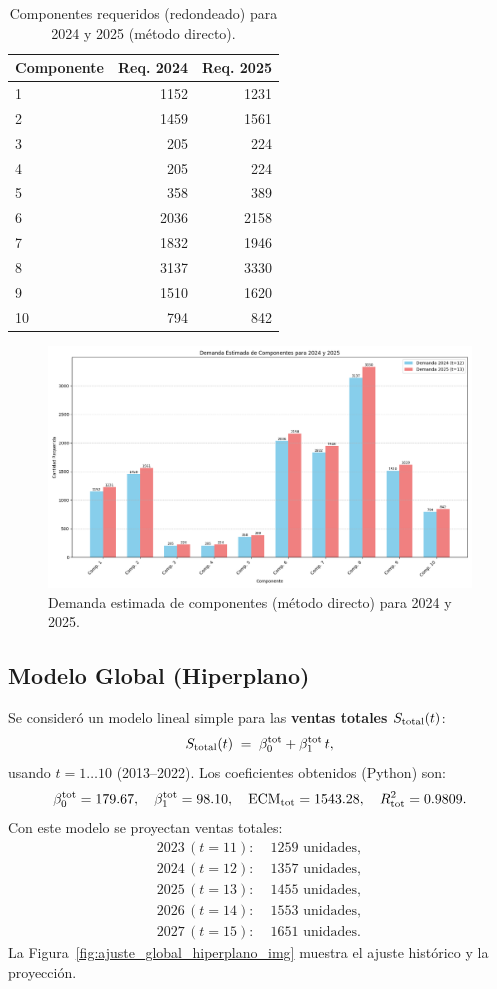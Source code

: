 \documentclass[12pt,a4paper]{article}
\newcommand{\tablesmall}{\scriptsize}
\begin{document}
\begin{table}[H]
\tablesmall
\centering
\caption{Componentes requeridos (redondeado) para 2024 y 2025 (método directo).}
\label{tab:componentes_directos}
\begin{tabular}{@{}lrr@{}}
\toprule
Componente & Req. 2024 & Req. 2025 \\ \midrule
1  & 1152 & 1231 \\
2  & 1459 & 1561 \\
3  & 205  & 224  \\
4  & 205  & 224  \\
5  & 358  & 389  \\
6  & 2036 & 2158 \\
7  & 1832 & 1946 \\
8  & 3137 & 3330 \\
9  & 1510 & 1620 \\
10 & 794  & 842  \\ \bottomrule
\end{tabular}
\end{table}

\begin{figure}[H]
\centering
\includegraphics[width=0.7\linewidth]{Demanda estimada de componentes para 2024 y 2025.png}
\caption{Demanda estimada de componentes (método directo) para 2024 y 2025.}
\label{fig:demanda_componentes_2024_2025_img}
\end{figure}

\subsection{Modelo Global (Hiperplano)}
Se consideró un modelo lineal simple para las \textbf{ventas totales} $S_{\rm total}(t)$:
\[
S_{\rm total}(t) \;=\; \beta_0^{\rm tot} + \beta_1^{\rm tot}\,t,
\]
usando $t=1\dots10$ (2013–2022). Los coeficientes obtenidos (Python) son:
\[
\beta_0^{\rm tot} = 179.67,\quad \beta_1^{\rm tot} = 98.10,\quad
\text{ECM}_{\rm tot} = 1543.28,\quad R^2_{\rm tot} = 0.9809.
\]
Con este modelo se proyectan ventas totales:
\[
\begin{aligned}
2023\,(t=11):\;&1259\text{ unidades},\\
2024\,(t=12):\;&1357\text{ unidades},\\
2025\,(t=13):\;&1455\text{ unidades},\\
2026\,(t=14):\;&1553\text{ unidades},\\
2027\,(t=15):\;&1651\text{ unidades}.
\end{aligned}
\]
La Figura~\ref{fig:ajuste_global_hiperplano_img} muestra el ajuste histórico y la proyección.
\end{document}
